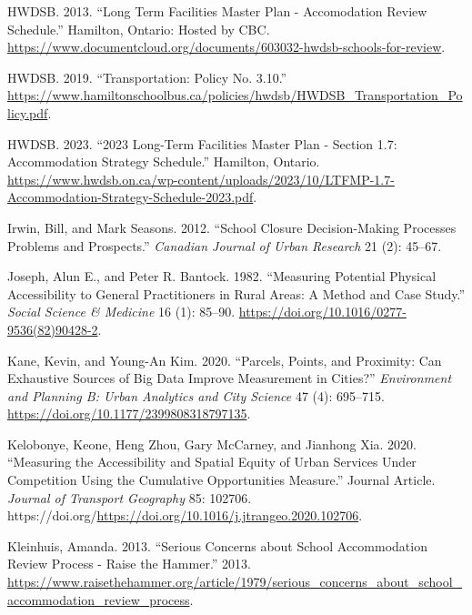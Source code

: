 \documentclass[
default
]{sn-jnl}
\newlength{\cslhangindent}
\newenvironment{CSLReferences}[2] %
 {\begin{list}{}{%
  \setlength{\itemindent}{0pt}
  \setlength{\leftmargin}{0pt}
  \setlength{\parsep}{0pt}
  \ifodd #1
   \setlength{\leftmargin}{\cslhangindent}
   \setlength{\itemindent}{-1\cslhangindent}
  \fi
  \setlength{\itemsep}{#2\baselineskip}}}
 {\end{list}}
\begin{document}
\begin{CSLReferences}{1}{0}
HWDSB. 2013. {``Long Term Facilities Master Plan - Accomodation Review
Schedule.''} Hamilton, Ontario: Hosted by {CBC}.
\url{https://www.documentcloud.org/documents/603032-hwdsb-schools-for-review}.

HWDSB. 2019. {``Transportation: Policy No. 3.10.''}
\url{https://www.hamiltonschoolbus.ca/policies/hwdsb/HWDSB_Transportation_Policy.pdf}.

HWDSB. 2023. {``2023 Long-Term Facilities Master Plan - Section 1.7:
Accommodation Strategy Schedule.''} Hamilton, Ontario.
\url{https://www.hwdsb.on.ca/wp-content/uploads/2023/10/LTFMP-1.7-Accommodation-Strategy-Schedule-2023.pdf}.

Irwin, Bill, and Mark Seasons. 2012. {``School {Closure Decision-Making
Processes Problems} and {Prospects}.''} \emph{Canadian Journal of Urban
Research} 21 (2): 45--67.

Joseph, Alun E., and Peter R. Bantock. 1982. {``Measuring Potential
Physical Accessibility to General Practitioners in Rural Areas: A Method
and Case Study.''} \emph{Social Science \& Medicine} 16 (1): 85--90.
\url{https://doi.org/10.1016/0277-9536(82)90428-2}.

Kane, Kevin, and Young-An Kim. 2020. {``Parcels, Points, and Proximity:
Can Exhaustive Sources of Big Data Improve Measurement in Cities?''}
\emph{Environment and Planning B: Urban Analytics and City Science} 47
(4): 695--715. \url{https://doi.org/10.1177/2399808318797135}.

Kelobonye, Keone, Heng Zhou, Gary McCarney, and Jianhong Xia. 2020.
{``Measuring the Accessibility and Spatial Equity of Urban Services
Under Competition Using the Cumulative Opportunities Measure.''} Journal
Article. \emph{Journal of Transport Geography} 85: 102706.
https://doi.org/\url{https://doi.org/10.1016/j.jtrangeo.2020.102706}.

Kleinhuis, Amanda. 2013. {``Serious Concerns about School Accommodation
Review Process - Raise the Hammer.''} 2013.
\url{https://www.raisethehammer.org/article/1979/serious_concerns_about_school_accommodation_review_process}.


\end{CSLReferences}
\end{document}
